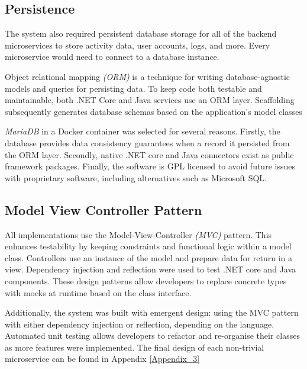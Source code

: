 \subsection{Persistence}
    \par
    The system also required persistent database storage for all of the backend microservices to store activity data, user accounts, logs, and more. Every microservice would need to connect to a database instance.

    \par
    Object relational mapping \textit{(ORM)} is a technique for writing database-agnostic models and queries for persisting data. To keep code both testable and maintainable, both .NET Core and Java services use an ORM layer. Scaffolding subsequently generates database schemas based on the application's model classes

    \par
    \textit{MariaDB}\cite{MariaDB} in a Docker container was selected for several reasons. Firstly, the database provides data consistency guarantees when a record it persisted from the ORM layer. Secondly, native .NET core and Java connectors exist as public framework packages. Finally, the software is GPL licensed to avoid future issues with proprietary software, including alternatives such as Microsoft SQL.

\subsection{Model View Controller Pattern}
    \par
    All implementations use the Model-View-Controller \textit{(MVC)}
    pattern. This enhances testability by keeping constraints and functional logic within a model class. Controllers use an instance of the model and prepare data for return in a view. Dependency injection and reflection were used to test .NET core and Java components. These design patterns allow developers to replace concrete types with mocks at runtime based on the class interface.

    \par
    Additionally, the system was built with emergent design: using the MVC pattern with either dependency injection or reflection, depending on the language. Automated unit testing allows developers to refactor and re-organise their classes as more features were implemented. The final design of each non-trivial microservice can be found in Appendix \ref{Appendix_3}

